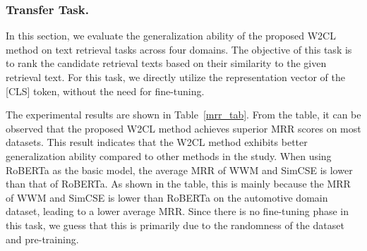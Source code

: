 \subsubsection{Transfer Task.}In this section, we evaluate the generalization ability of the proposed W2CL method on text retrieval tasks across four domains. The objective of this task is to rank the candidate retrieval texts based on their similarity to the given retrieval text. For this task, we directly utilize the representation vector of the [CLS] token, without the need for fine-tuning.

The experimental results are shown in Table~\ref{mrr_tab}. From the table, it can be observed that the proposed W2CL method achieves superior MRR scores on most datasets. This result indicates that the W2CL method exhibits better generalization ability compared to other methods in the study. When using RoBERTa as the basic model, the average MRR of WWM and SimCSE is lower than that of RoBERTa. As shown in the table, this is mainly because the MRR of WWM and SimCSE is lower than RoBERTa on the automotive domain dataset, leading to a lower average MRR. Since there is no fine-tuning phase in this task, we guess that this is primarily due to the randomness of the dataset and pre-training.

